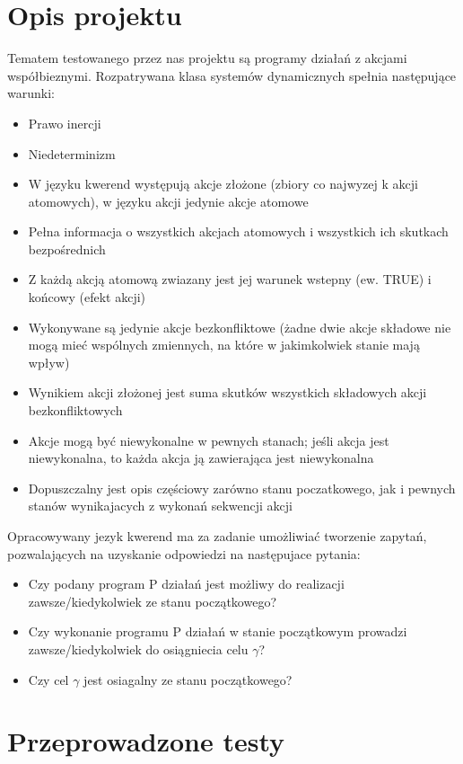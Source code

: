 \documentclass{article}
\begin{document}
\newpage

\section{Opis projektu}
Tematem testowanego przez nas projektu są programy działań z akcjami współbieznymi. Rozpatrywana klasa systemów dynamicznych spełnia następujące warunki:
\begin{itemize}
    \item Prawo inercji
    \item Niedeterminizm
    \item W języku kwerend występują akcje złożone (zbiory co najwyzej k akcji atomowych), w języku akcji jedynie akcje atomowe
    \item Pełna informacja o wszystkich akcjach atomowych i wszystkich ich skutkach bezpośrednich
    \item Z każdą akcją atomową zwiazany jest jej warunek wstepny (ew. TRUE) i końcowy (efekt akcji)
    \item Wykonywane są jedynie akcje bezkonfliktowe (żadne dwie akcje składowe nie mogą mieć wspólnych zmiennych, na które w jakimkolwiek stanie mają wpływ)
    \item Wynikiem akcji złożonej jest suma skutków wszystkich składowych akcji bezkonfliktowych
    \item Akcje mogą być niewykonalne w pewnych stanach; jeśli akcja jest niewykonalna, to każda akcja ją zawierająca jest niewykonalna
    \item Dopuszczalny jest opis częściowy zarówno stanu poczatkowego, jak i pewnych stanów wynikajacych z wykonań sekwencji akcji
\end{itemize}

Opracowywany jezyk kwerend ma za zadanie umożliwiać tworzenie zapytań,
pozwalających na uzyskanie odpowiedzi na następujace pytania:
\begin{itemize}
    \item Czy podany program P działań jest możliwy do realizacji  zawsze/kiedykolwiek ze stanu początkowego?
    \item Czy wykonanie programu P działań w stanie początkowym prowadzi zawsze/kiedykolwiek do osiągniecia celu $\gamma$?
    \item Czy cel $\gamma$ jest osiagalny ze stanu początkowego?
\end{itemize}
\newpage

\section{Przeprowadzone testy}
\end{document}
